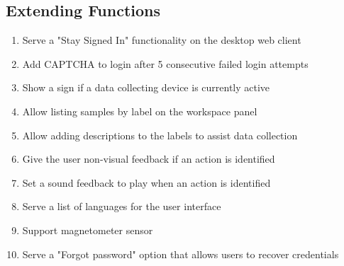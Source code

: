 \subsection{Extending Functions}
\begin{enumerate}[resume*]
    \item \label{itm:stay-signed}Serve a "Stay Signed In" functionality on the desktop web client
    \item \label{itm:CAPTCHA}Add \gls{CAPTCHA} to login after 5 consecutive failed login attempts
    \item \label{itm:active-sign}Show a sign if a data collecting device is currently active
    \item \label{itm:filter-by-label}Allow listing samples by \gls{label} on the \gls{workspace} panel
    \item \label{itm:label-description}Allow adding descriptions to the labels to assist data collection
    \item \label{itm:nonvisual-feedback} Give the user non-visual feedback if an action is identified
    \item \label{itm:sound-feedback}Set a sound feedback to play when an action is identified
    \item \label{itm:language}Serve a list of languages for the user interface
    \item \label{itm:magnetometer}Support \gls{magnetometer} \gls{sensor}
    \item \label{itm:forgot-password}Serve a "Forgot password" option that allows users to recover credentials
\end{enumerate}